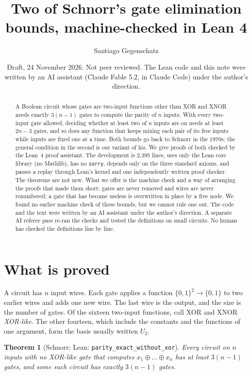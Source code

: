 \documentclass[11pt]{amsart}
\title[Two gate elimination bounds in Lean 4]{Two of Schnorr's gate elimination bounds,
machine-checked in Lean 4}
\author{Santiago Gegenschatz}
\date{Draft, 24 November 2026. Not peer reviewed. The Lean code and this note were written by
an AI assistant (Claude Fable 5.2, in Claude Code) under the author's direction.}
\newtheorem{theorem}{Theorem}
\theoremstyle{definition}
\theoremstyle{remark}
\newcommand{\lean}[1]{\texttt{#1}}
\begin{document}
\begin{abstract}
A Boolean circuit whose gates are two-input functions other than XOR and XNOR needs exactly
$3(n-1)$ gates to compute the parity of $n$ inputs. With every two-input gate allowed,
deciding whether at least two of $n$ inputs are on needs at least $2n-3$ gates, and so does
any function that keeps mixing each pair of its free inputs while inputs are fixed one at a
time. Both bounds go back to Schnorr in the 1970s; the general condition in the second is our
variant of his. We give proofs of both checked by the Lean~4 proof assistant. The development is 2{,}395 lines, uses only the Lean core library (no Mathlib), has
no \lean{sorry}, depends only on the three standard axioms, and passes a replay through Lean's
kernel and one independently written proof checker. The theorems are not new. What we offer is the machine check and a way of arranging
the proofs that made them short: gates are never removed and wires are never renumbered; a
gate that has become useless is overwritten in place by a free node. We found no earlier
machine check of these bounds, but we cannot rule one out. The code and the text were written
by an AI assistant under the author's direction. A separate AI referee pass re-ran the checks
and tested the definitions on small circuits. No human has checked the definitions line by
line.
\end{abstract}

\maketitle

\section{What is proved}

A circuit has $n$ input wires. Each gate applies a function $\{0,1\}^2\to\{0,1\}$ to two
earlier wires and adds one new wire. The last wire is the output, and the size is the number
of gates. Of the sixteen two-input functions, call XOR and XNOR \emph{XOR-like}. The other
fourteen, which include the constants and the functions of one argument, form the basis
usually written $U_2$.

\begin{theorem}[Schnorr; Lean: \lean{parity\_exact\_without\_xor}]\label{thm:main}
Every circuit on $n$ inputs with no XOR-like gate that computes
$x_1\oplus\dots\oplus x_n$ has at least $3(n-1)$ gates, and some such circuit has exactly
$3(n-1)$ gates.
\end{theorem}
\end{document}
